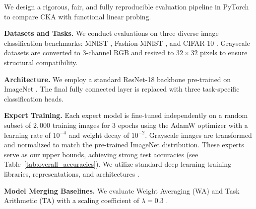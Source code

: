 \documentclass{article}
\theoremstyle{plain}
\theoremstyle{definition}
\theoremstyle{remark}
\begin{document}
We design a rigorous, fair, and fully reproducible evaluation pipeline in PyTorch to compare CKA with functional linear probing.

\textbf{Datasets and Tasks.} We conduct evaluations on three diverse image classification benchmarks: MNIST \cite{lecun1998gradient}, Fashion-MNIST \cite{xiao2017fashion}, and CIFAR-10 \cite{krizhevsky2009learning}. Grayscale datasets are converted to 3-channel RGB and resized to $32 \times 32$ pixels to ensure structural compatibility.

\textbf{Architecture.} We employ a standard ResNet-18 backbone \cite{he2016deep} pre-trained on ImageNet \cite{deng2009imagenet}. The final fully connected layer is replaced with three task-specific classification heads.

\textbf{Expert Training.} Each expert model is fine-tuned independently on a random subset of $2,000$ training images for 3 epochs using the AdamW optimizer with a learning rate of $10^{-4}$ and weight decay of $10^{-2}$. Grayscale images are transformed and normalized to match the pre-trained ImageNet distribution. These experts serve as our upper bounds, achieving strong test accuracies (see Table~\ref{tab:overall_accuracies}). We utilize standard deep learning training libraries, representations, and architectures \cite{he2016deep, simonyan2014very, szegedy2015going, kingma2014adam, ioffe2015batch, hinton2015distilling, li2018visualizing, vaswani2017attention, devlin2018bert, radford2021clip, chen2020simple, he2020momentum, srivastava2014dropout, glorot2010understanding, sutskever2013importance, paszke2019pytorch, loshchilov2016sgdr, hendrycks2016gaussian, chollet2017xception, huang2017densely}.

\textbf{Model Merging Baselines.} We evaluate Weight Averaging (WA) and Task Arithmetic (TA) with a scaling coefficient of $\lambda = 0.3$ \cite{ilharco2022editing}.
\end{document}
